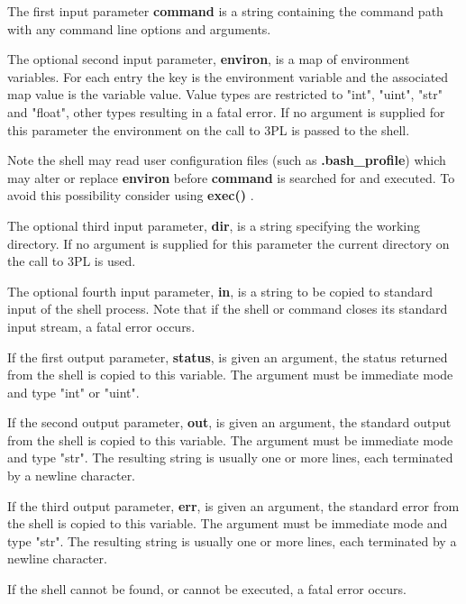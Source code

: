         The first input parameter {\bf command} is a string containing the
        command path with any command line options and arguments.
        
        The optional second input parameter, {\bf environ}, is a map of environment
        variables. For each entry the key is the environment variable and the
        associated map value is the variable value. Value types are restricted
        to "int", "uint", "str" and "float", other types resulting in a fatal error.
        If no argument is supplied for this parameter the environment on the
        call to 3PL is passed to the shell.

	Note the shell may read user configuration files (such as {\bf
	.bash\_profile}) which may alter or replace {\bf environ} before {\bf command} is
	searched for and executed.
        To avoid this possibility consider using {\bf exec()} .
        
        The optional third input parameter, {\bf dir}, is a string specifying the working
        directory. If no argument is supplied for this parameter the current
        directory on the call to 3PL is used.
        
        The optional fourth input parameter, {\bf in}, is a string to be copied to
        standard input of the shell process. Note that if the shell or command
	closes its standard input stream, a fatal error occurs.
        
        If the first output parameter, {\bf status}, is given an argument, the
        status returned from the shell is copied to this variable. The argument
        must be immediate mode and type "int" or "uint".
        
        If the second output parameter, {\bf out}, is given an argument, the
        standard output from the shell is copied to this variable. The argument
        must be immediate mode and type "str". The resulting string is usually
        one or more lines, each terminated by a newline character.
        
        If the third output parameter, {\bf err}, is given an argument, the
        standard error from the shell is copied to this variable. The argument
        must be immediate mode and type "str". The resulting string is usually
        one or more lines, each terminated by a newline character.
        
        If the shell cannot be found, or cannot be executed, a fatal error occurs.
        
